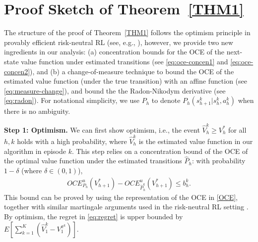 \documentclass[11pt]{article}
\newcommand{\1}{\mathbbm{1}}
\begin{document}
\section{Proof Sketch of Theorem~\ref{THM1}}\label{sec:sketch}
The structure of the proof of Theorem~\ref{THM1} follows the optimism principle in provably efficient risk-neutral RL (see, e.g., \citep[Chapter 7]{agarwal2019reinforcement}), however, we provide two new ingredients in our analysis: (a) concentration bounds for the OCE of the next-state
value function under estimated transitions (see \eqref{eq:oce-concen1} and \eqref{eq:oce-concen2}), and (b) a change-of-measure technique to bound the OCE of the estimated value function (under the
true transition) with an affine function (see \eqref{eq:measure-change}), and bound the the Radon-Nikodym derivative (see \eqref{eq:radon}). For notational simplicity, we use $P_h$ to denote $P_h(s_{h+1}^k\vert s_h^k,a_h^k)$ when there is no ambiguity. 









\noindent\textbf{Step 1: Optimism.} We can first show optimism, i.e., the event $\hat{V}_{h}^k\geq V_{h}^*$ for all $h,k$ holds with a high probability, where $\hat{V}_{h}^k$ is the estimated value function in our algorithm in episode $k$.
 This step relies on a concentration bound of the OCE of the optimal value function under the estimated transitions $\hat P_h$: with probability $1-\delta$ (where $\delta \in (0,1)$),
\begin{align}\label{eq:oce-concen1}
OCE^u_{P_h}(V_{h+1}^*)-OCE^u_{\hat{P}^k_h}(V_{h+1}^*) \le b_h^k. 
\end{align}
This bound can be proved by using the representation of the OCE in \eqref{OCE}, together with similar martingale arguments used in the risk-neutral RL setting \citep[Lemma 7.3]{agarwal2019reinforcement}. By optimism, the regret in \eqref{eq:regret} is upper bounded by $E[\sum_{k=1}^K(\hat{V}_1^k-V_1^{\pi^k})]$. 
\end{document}
